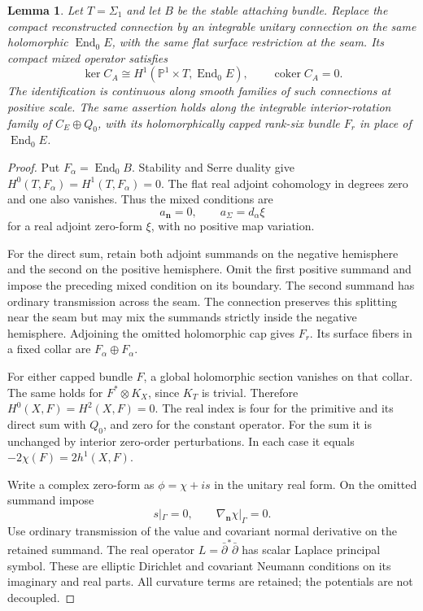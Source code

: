 \documentclass[11pt]{amsart}
\newtheorem{lemma}[theorem]{Lemma}
\theoremstyle{definition}
\theoremstyle{remark}
\theoremstyle{plain}
\newcommand{\PP}{\mathbb{P}}
\newcommand{\End}{\operatorname{End}}
\begin{document}
\begin{lemma}\label{lem:torus-integrable-kernel}
Let $T=\Sigma_1$ and let $B$ be the stable attaching bundle.
Replace the compact reconstructed connection by an
integrable unitary connection on the same holomorphic
$\End_0E$, with the same flat surface restriction at the
seam. Its compact mixed operator satisfies
\[
 \ker C_A\cong H^1(\PP^1\times T,\End_0E),
                    \qquad\operatorname{coker}C_A=0.
\]
The identification is continuous along smooth families
of such connections at positive scale. The same assertion
holds along the integrable interior-rotation family of
$C_E\oplus Q_0$, with its holomorphically capped rank-six
bundle $F_r$ in place of $\End_0E$.
\end{lemma}

\begin{proof}
Put $F_\alpha=\End_0B$. Stability and Serre duality
give $H^0(T,F_\alpha)=H^1(T,F_\alpha)=0$.
The flat real adjoint cohomology in degrees zero
and one also vanishes. Thus the mixed conditions are
\[
              a_{\mathbf n}=0,\qquad a_\Sigma=d_\alpha\xi
\]
for a real adjoint zero-form $\xi$, with no positive
map variation.

For the direct sum, retain both adjoint summands
on the negative hemisphere and the second on the
positive hemisphere. Omit the first positive
summand and impose the preceding mixed condition
on its boundary. The second summand has ordinary
transmission across the seam. The connection
preserves this splitting near the seam but may
mix the summands strictly inside the negative
hemisphere. Adjoining the omitted holomorphic
cap gives $F_r$. Its surface fibers in a fixed
collar are $F_\alpha\oplus F_\alpha$.

For either capped bundle $F$, a global holomorphic
section vanishes on that collar. The same holds
for $F^*\otimes K_X$, since $K_T$ is trivial.
Therefore $H^0(X,F)=H^2(X,F)=0$.
The real index is four for the primitive and
its direct sum with $Q_0$, and zero for the
constant operator. For the sum it is unchanged
by interior zero-order perturbations. In each
case it equals $-2\chi(F)=2h^1(X,F)$.

Write a complex zero-form as $\phi=\chi+i s$
in the unitary real form. On the omitted
summand impose
\begin{equation}\label{eq:torus-coupled-potential-boundary}
 s|_\Gamma=0,\qquad \nabla_{\mathbf n}\chi|_\Gamma=0.
\end{equation}
Use ordinary transmission of the value and
covariant normal derivative on the retained
summand. The real operator
$L=\bar\partial^*\bar\partial$ has scalar
Laplace principal symbol. These are elliptic
Dirichlet and covariant Neumann conditions
on its imaginary and real parts. All curvature
terms are retained; the potentials are not
decoupled.


\end{proof}
\end{document}

